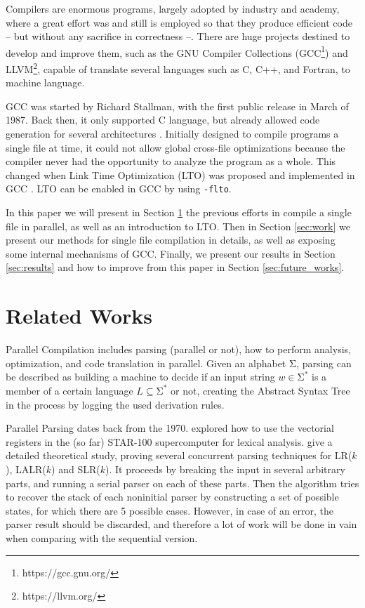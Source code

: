 \documentclass[runningheads]{llncs}
\begin{document}
Compilers are enormous programs, largely adopted by industry and academy, where
a great effort was and still is employed so that they produce efficient code --
but without any sacrifice in correctness --. There are huge projects destined
to develop and improve them, such as the GNU Compiler Collections
(GCC\footnote{https://gcc.gnu.org/}) and LLVM\footnote{https://llvm.org/}, capable
of translate several languages such as C, C++, and Fortran, to machine language.

GCC was started by Richard Stallman, with the first public release in March of
1987. Back then, it
only supported C language, but already allowed code generation for several
architectures \cite{gcc-first-ver}. Initially designed to compile programs a
single file at time, it could not allow global cross-file optimizations because
the compiler never had the opportunity to analyze the program as a whole. This
changed when Link Time Optimization (LTO) was proposed \cite{whoprgoogle} and
implemented in GCC \cite{glek2010optimizing}. LTO can be enabled in GCC by
using \texttt{-flto}.

In this paper we will present in Section \ref{sec:related} the previous
efforts in compile a single file in parallel, as well as an introduction
to LTO. Then in Section \ref{sec:work} we present our methods for single
file compilation in details, as well as exposing some internal mechanisms
of GCC. Finally, we present our results in Section \ref{sec:results} and
how to improve from this paper in Section \ref{sec:future_works}.

\section{Related Works} \label{sec:related}

Parallel Compilation includes parsing (parallel or not),
how to perform analysis, optimization, and code translation in parallel.
Given an alphabet $\mathrm{\Sigma}$, parsing can be described as building a machine to decide if
an input string $w \in \mathrm{\Sigma}^*$ is a member of a certain language $L
\subseteq \mathrm{\Sigma}^*$ or not, creating the Abstract Syntax Tree in the
process by logging the used derivation rules.

Parallel Parsing dates back from the 1970. \cite{Lincoln:1970:PPT:987475.987478}
explored how to use the vectorial registers in the (so far)
STAR-100 supercomputer for lexical analysis.
\cite{fischer1975parsing} give a detailed theoretical study, proving
several concurrent parsing techniques for LR($k$), LALR($k$) and SLR($k$).
It proceeds by breaking the input in several arbitrary parts, and running a
serial parser on each of these parts. Then the algorithm tries to
recover the stack of each noninitial parser by constructing a set of
possible states, for which there are 5 possible cases. However, in case
of an error, the parser result should be discarded, and therefore a lot
of work will be done in vain when comparing with the sequential version.
\end{document}
